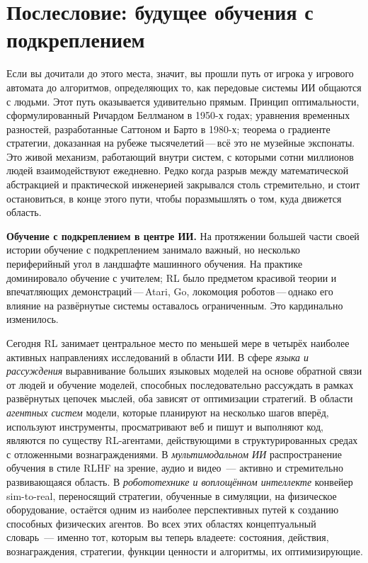 \chapter*{Послесловие: будущее обучения с подкреплением}

Если вы дочитали до этого места, значит, вы прошли путь от игрока у игрового автомата до алгоритмов, определяющих то, как передовые системы ИИ общаются с людьми. Этот путь оказывается удивительно прямым. Принцип оптимальности, сформулированный Ричардом Беллманом в 1950-х годах; уравнения временных разностей, разработанные Саттоном и Барто в 1980-х; теорема о градиенте стратегии, доказанная на рубеже тысячелетий\,---\,всё это не музейные экспонаты. Это живой механизм, работающий внутри систем, с которыми сотни миллионов людей взаимодействуют ежедневно. Редко когда разрыв между математической абстракцией и практической инженерией закрывался столь стремительно, и стоит остановиться, в конце этого пути, чтобы поразмышлять о том, куда движется область.

\medskip

\textbf{Обучение с подкреплением в центре ИИ.}\quad
На протяжении большей части своей истории обучение с подкреплением занимало важный, но несколько периферийный угол в ландшафте машинного обучения. На практике доминировало обучение с учителем; RL было предметом красивой теории и впечатляющих демонстраций\,---\,Atari, Go, локомоция роботов\,---\,однако его влияние на развёрнутые системы оставалось ограниченным. Это кардинально изменилось.

Сегодня RL занимает центральное место по меньшей мере в четырёх наиболее активных направлениях исследований в области ИИ. В сфере \emph{языка и рассуждения} выравнивание больших языковых моделей на основе обратной связи от людей и обучение моделей, способных последовательно рассуждать в рамках развёрнутых цепочек мыслей, оба зависят от оптимизации стратегий. В области \emph{агентных систем} модели, которые планируют на несколько шагов вперёд, используют инструменты, просматривают веб и пишут и выполняют код, являются по существу RL-агентами, действующими в структурированных средах с отложенными вознаграждениями. В \emph{мультимодальном ИИ} распространение обучения в стиле RLHF на зрение, аудио и видео~--- активно и стремительно развивающаяся область. В \emph{робототехнике и воплощённом интеллекте} конвейер sim-to-real, переносящий стратегии, обученные в симуляции, на физическое оборудование, остаётся одним из наиболее перспективных путей к созданию способных физических агентов. Во всех этих областях концептуальный словарь~--- именно тот, которым вы теперь владеете: состояния, действия, вознаграждения, стратегии, функции ценности и алгоритмы, их оптимизирующие.

